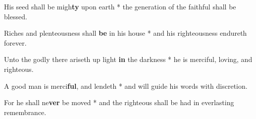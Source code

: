 \begin{multicols}{2}
	His seed shall be migh\textbf{ty} upon earth * the generation of the faithful shall be blessed.
	
	Riches and plenteousness shall \textbf{be} in his house * and his righteousness endureth forever.
	
	Unto the godly there ariseth up light \textbf{in} the darkness * he is merciful, loving, and righteous.
	
	A good man is merci\textbf{ful}, and lendeth * and will guide his words with discretion.
	
	For he shall ne\textbf{ver} be moved * and the righteous shall be had in everlasting remembrance.
\end{multicols}